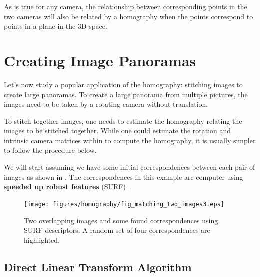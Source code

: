 As \eqn{\ref{eq:projectionintofirstcamera}} is true for any camera, the relationship between corresponding points in the two cameras will also be related by a homography when the points correspond to points in a plane in the 3D space. 


\section{Creating Image Panoramas}


Let's now study a popular application of the homography: stitching images to create large panoramas. To create a large panorama from multiple pictures, the images need to be taken by a rotating camera without translation.  

To stitch together images, one needs to estimate the homography relating the images to be stitched together.  While one could estimate the rotation and intrinsic camera matrices within \eqn{\ref{eq:homo3}} to compute the homography, it is usually simpler to follow the procedure below.


We will start assuming we have some initial correspondences between each pair of images as shown in \fig{\ref{fig:fig_matching_two_images}}. The correspondences in this example are computer using {\bf speeded up robust features} (SURF) \cite{Bay2008346}. 


\begin{figure}[h!]
\centerline{
\texttt{[image: figures/homography/fig\_matching\_two\_images3.eps]}
}
\caption{Two overlapping images and some found correspondences using SURF descriptors. A random set of four correspondences are highlighted.}
\label{fig:fig_matching_two_images}
\end{figure}

\subsection{Direct Linear Transform Algorithm}

